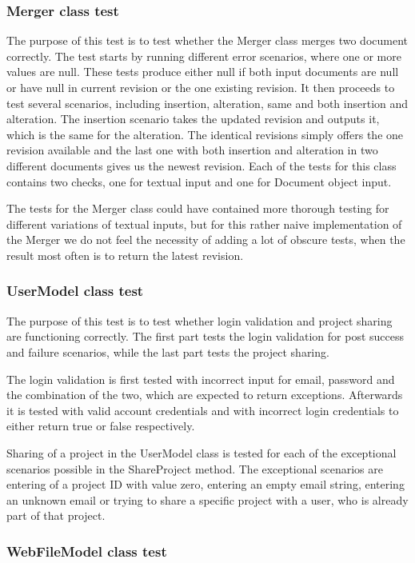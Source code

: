\subsubsection{Merger class test}
The purpose of this test is to test whether the Merger class merges two document correctly. The test starts by running different error scenarios, where one or more values are null. These tests produce either null if both input documents are null or have null in current revision or the one existing revision.
It then proceeds to test several scenarios, including insertion, alteration, same and both insertion and alteration. The insertion scenario takes the updated revision and outputs it, which is the same for the alteration. The identical revisions simply offers the one revision available and the last one with both insertion and alteration in two different documents gives us the newest revision. Each of the tests for this class contains two checks, one for textual input and one for Document object input.

The tests for the Merger class could have contained more thorough testing for different variations of textual inputs, but for this rather naive implementation of the Merger we do not feel the necessity of adding a lot of obscure tests, when the result most often is to return the latest revision.

\subsubsection{UserModel class test}
The purpose of this test is to test whether login validation and project sharing are functioning correctly. The first part tests the login validation for post success and failure scenarios, while the last part tests the project sharing.

The login validation is first tested with incorrect input for email, password and the combination of the two, which are expected to return exceptions. Afterwards it is tested with valid account credentials and with incorrect login credentials to either return true or false respectively.

Sharing of a project in the UserModel class is tested for each of the exceptional scenarios possible in the ShareProject method. The exceptional scenarios are entering of a project ID with value zero, entering an empty email string, entering an unknown email or trying to share a specific project with a user, who is already part of that project.

\subsubsection{WebFileModel class test}
